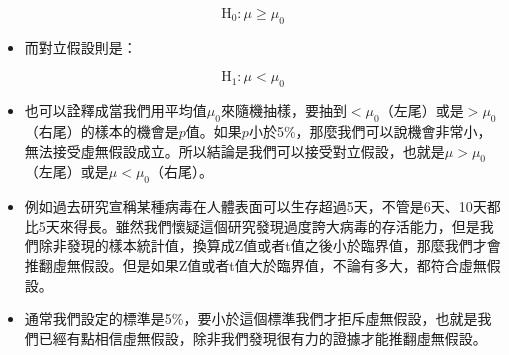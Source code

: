\documentclass[hyperref,]{ctexart}
\providecommand{\tightlist}{%
  \setlength{\itemsep}{0pt}\setlength{\parskip}{0pt}}
\begin{document}
\[\text{H}_{\text{0}}: \mu\geq \mu_{0}\]

\begin{itemize}
\tightlist
\item
  而對立假設則是：
\end{itemize}

\[\text{H}_{\text{1}}: \mu < \mu_{0}\]

\begin{itemize}
\item
  也可以詮釋成當我們用平均值\(\mu_{0}\)來隨機抽樣，要抽到\(<\mu_{0}\)（左尾）或是\(>\mu_{0}\)（右尾）的樣本的機會是\(p\)值。如果\(p\)小於5\%，那麼我們可以說機會非常小，無法接受虛無假設成立。所以結論是我們可以接受對立假設，也就是\(\mu>\mu_{0}\)（左尾）或是\(\mu < \mu_{0}\)（右尾）。
\item
  例如過去研究宣稱某種病毒在人體表面可以生存超過5天，不管是6天、10天都比5天來得長。雖然我們懷疑這個研究發現過度誇大病毒的存活能力，但是我們除非發現的樣本統計值，換算成Z值或者t值之後小於臨界值，那麼我們才會推翻虛無假設。但是如果Z值或者t值大於臨界值，不論有多大，都符合虛無假設。
\item
  通常我們設定的標準是5\%，要小於這個標準我們才拒斥虛無假設，也就是我們已經有點相信虛無假設，除非我們發現很有力的證據才能推翻虛無假設。
\end{itemize}
\end{document}
